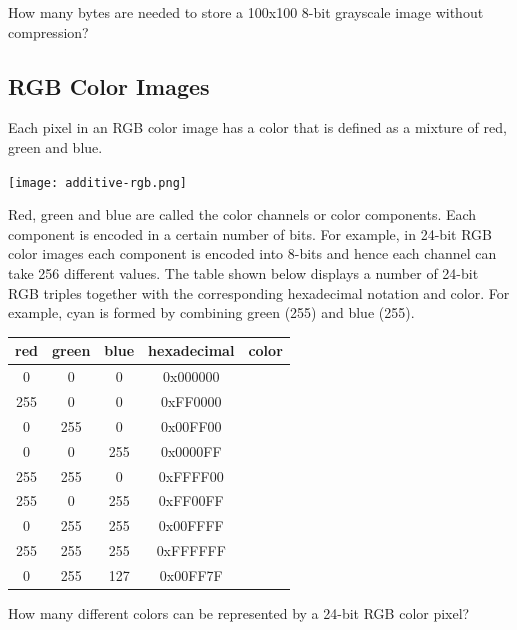 \documentclass{book}
\begin{document}
\begin{exercise}
How many bytes are needed to store a 100x100 8-bit grayscale image without compression?
\end{exercise}

\subsection{RGB Color Images}
Each pixel in an RGB color image has a color that is defined as a mixture of red, green and blue.
\begin{center}
\texttt{[image: additive-rgb.png]}
\end{center}
Red, green and blue are called the color channels or color components. Each component is encoded in a certain number of bits. For example, in 24-bit RGB color images each component is encoded into 8-bits and hence each channel can take 256 different values. The table shown below displays a number of 24-bit RGB triples together with the corresponding hexadecimal notation and color. For example, cyan is formed by combining green (255) and blue (255).

\begin{center}
\begin{tabular}{| c | c | c | c | c |}
\hline
red & green & blue & hexadecimal & color\\ \hline
0 & 0 & 0 & 0x000000 & \cellcolor{black}\\ \hline
255 & 0 & 0 & 0xFF0000 & \cellcolor{red}\\ \hline
0 & 255 & 0 & 0x00FF00 & \cellcolor{green}\\ \hline
0 & 0 & 255 & 0x0000FF & \cellcolor{blue}\\ \hline
255 & 255 & 0 & 0xFFFF00 & \cellcolor{yellow}\\ \hline
255 & 0 & 255 & 0xFF00FF & \cellcolor{magenta}\\ \hline
0 & 255 & 255 & 0x00FFFF & \cellcolor{cyan}\\ \hline
255 & 255 & 255 & 0xFFFFFF & \cellcolor{white}\\ \hline
0 & 255 & 127 & 0x00FF7F & \cellcolor{springgreen}\\ \hline
\end{tabular}
\end{center}

\begin{exercise}
How many different colors can be represented by a 24-bit RGB color pixel?
\end{exercise}
\end{document}
